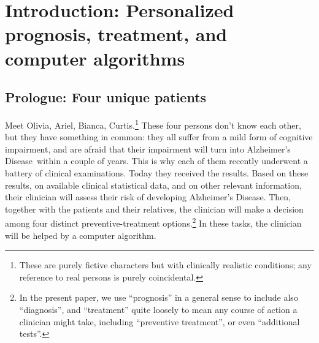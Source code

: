 \documentclass[utf8]{FrontiersinHarvard} %
\renewcommand*{\|}[1][]{\nonscript\:#1\vert\nonscript\:\mathopen{}}
\newcommand*{\ad}{Alzheimer's Disease}
\begin{document}
\newpage
\section{Introduction: Personalized prognosis, treatment, and computer algorithms}
\label{sec:intro}

\setcounter{subsection}{-1}
\subsection{Prologue: Four unique patients} %
\label{sec:four_patients}

Meet Olivia, Ariel, Bianca, Curtis.\footnote{These are purely fictive characters but with clinically realistic conditions; any reference to real persons is purely coincidental.}
These four persons don't know each other, but they have something in common: they all suffer from a mild form of cognitive impairment, and are afraid that their impairment will turn into \ad\ within a couple of years. This is why each of them recently underwent a battery %
of clinical examinations. Today they received the results. Based on these results, on available clinical statistical data, and on other relevant information, their clinician will 
assess their risk of developing \ad. Then, together with the patients and their relatives, the clinician will make a decision among four distinct preventive-treatment options.\footnote{In the present paper, we use \enquote{prognosis} in a general sense to include also \enquote{diagnosis}, and \enquote{treatment} quite loosely to mean any course of action a clinician might take, including \enquote{preventive treatment}, or even \enquote{additional tests}.} In these tasks, the clinician will be helped by a computer algorithm.
\end{document}
